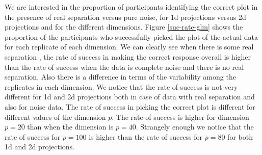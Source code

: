 \documentclass[12]{article}
\begin{document}
We are interested in the proportion of participants identifying the correct plot in the presence of real separation versus pure noise, for 1d projections versus 2d projections and for the different dimensions.
Figure \ref{suc-rate-glm} shows the proportion of the participants who successfully picked the plot of the actual data for each replicate of each dimension. We can clearly see when there is some real separation , the rate of success in making the correct response overall is higher than the rate of success when the data is complete noise and there is no real separation. Also there is a difference in terms of the variability among the replicates in each dimension.
We notice that the rate of success is not very different for 1d and 2d projections both in case of data with real separation and also for noise data. %
The rate of success in picking the correct plot is different for different values of the dimension $p$. The rate of success is higher for dimension $p = 20$ than when the dimension is $p = 40$. Strangely enough we notice that the rate of success for $p = 100$ is higher than the rate of success for $p=80$ for both 1d and 2d projections. 
\end{document}
